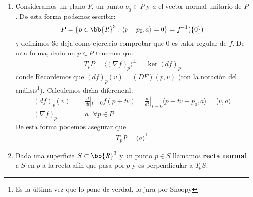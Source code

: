 \begin{ejemplo}
\begin{enumerate}
        \begin{enumerate}
            \item Consideramos un plano $P$, un punto $p_0\in P$ y $a$ el vector normal unitario de $P$. De esta forma podemos escribir:
            \begin{gather*}
                P = \{p\in \bb{R}^3 : \langle p - p_0, a\rangle = 0\} = f^{-1}(\{0\})
            \end{gather*}
            y definimos 
            Se deja como ejercicio comprobar que $0$ es valor regular de $f$.
            De esta forma, dado un $p\in P$ tenemos que 
            \begin{gather*}
                T_pP = \langle (\nabla f)_p \rangle^{\bot} = \ker(df)_p
            \end{gather*}
            donde
            Recordemos que $(df)_p(v)=(DF)(p,v)$ (con la notación del análisis\footnote{Es la última vez que lo pone de verdad, lo jura por Snoopy}). Calculemos dicha diferencial:
            \begin{align*}
                (df)_p(v)&= \frac{d}{dt}|_{t=0} f(p+tv) = \frac{d}{dt}|_{t=0} \langle p + tv - p_0, a \rangle = \langle v,a \rangle\\
                (\nabla f)_p &= a \ \ \ \forall p \in P
            \end{align*}
            De esta forma podemos asegurar que 
            \begin{gather*}
                T_pP = \langle a \rangle^{\bot}
            \end{gather*}

            \item \begin{definicion}
                Dada una superficie $S\subset \bb{R}^3$ y un punto $p\in S$ llamamos \textbf{recta normal} a $S$ en $p$ a la recta afín que pasa por $p$ y es perpendicular a $T_pS$.
            \end{definicion}


\end{enumerate}
\end{enumerate}
\end{ejemplo}
